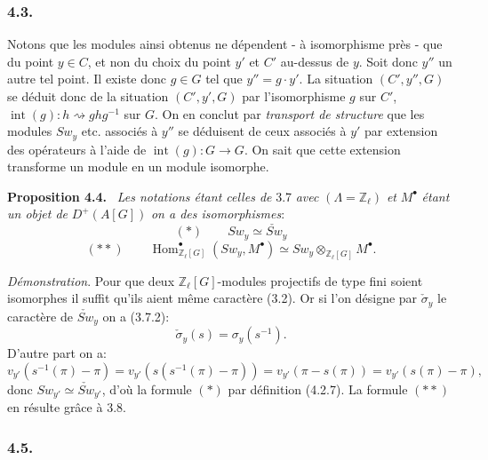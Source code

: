 \documentclass[11pt]{article}
\newenvironment{statement}[1]{\par\medskip\noindent\textbf{#1.}\ }{\par\medskip}
\DeclareMathOperator{\Hom}{Hom}
\providecommand{\Hom}{\operatorname{Hom}}
\providecommand{\Hom}{\operatorname{Hom}}
\begin{document}
\subsubsection*{4.3.}

Notons que les modules ainsi obtenus ne dépendent - à isomorphisme près - que du point $y\in C$, et non du choix du point $y'$ et $C'$ au-dessus de $y$. Soit donc $y''$ un autre tel point. Il existe donc $g\in G$ tel que $y''=g\cdot y'$. La situation $(C',y'',G)$ se déduit donc de la situation $(C',y',G)$ par l'isomorphisme $g$ sur $C'$, $\operatorname{int}(g):h\rightsquigarrow ghg^{-1}$ sur $G$. On en conclut par \emph{transport de structure} que les modules $Sw_y$ etc. associés à $y''$ se déduisent de ceux associés à $y'$ par extension des opérateurs à l'aide de $\operatorname{int}(g):G\to G$. On sait que cette extension transforme un module en un module isomorphe.

\begin{statement}{Proposition 4.4}
\emph{Les notations étant celles de} 3.7 \emph{avec} $(\Lambda=\mathbb Z_\ell)$ \emph{et} $M^\bullet$ \emph{étant un objet de} $D^+(A[G])$ \emph{on a des isomorphismes}:
\[
(*)\qquad Sw_y\simeq \check{Sw}_y
\]
\[
(**)\qquad
\Hom^\bullet_{\mathbb Z_\ell[G]}(Sw_y,M^\bullet)
\simeq Sw_y\otimes_{\mathbb Z_\ell[G]}M^\bullet.
\]
\end{statement}

\emph{Démonstration}. Pour que deux $\mathbb Z_\ell[G]$-modules projectifs de type fini soient isomorphes il suffit qu'ils aient même caractère (3.2). Or si l'on désigne par $\check\sigma_y$ le caractère de $\check{Sw}_y$ on a (3.7.2):
\[
\check\sigma_y(s)=\sigma_y(s^{-1}).
\]
D'autre part on a:
\[
v_{y'}(s^{-1}(\pi)-\pi)
=v_{y'}(s(s^{-1}(\pi)-\pi))
=v_{y'}(\pi-s(\pi))
=v_{y'}(s(\pi)-\pi),
\]
donc $Sw_{y'}\simeq\check{Sw}_{y'}$, d'où la formule $(*)$ par définition (4.2.7). La formule $(**)$ en résulte grâce à 3.8.

\subsubsection*{4.5.}
\end{document}
